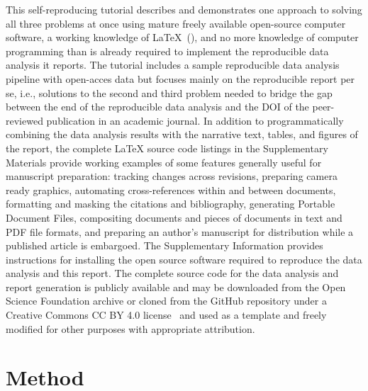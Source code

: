 \documentclass[helv,10pt,man,floatsintext]{apa6}  %
\begin{document}
This self-reproducing tutorial describes and demonstrates one approach
to solving all three problems at once using mature freely available
open-source computer software, a working knowledge of
\LaTeX{}~(\cite{latexproject}), and no more knowledge of computer
programming than is already required to implement the reproducible
data analysis it reports. The tutorial includes a sample reproducible
data analysis pipeline with open-acces data but focuses mainly on the
reproducible report per se, i.e., solutions to the second and third
problem needed to bridge the gap between the end of the reproducible
data analysis and the DOI of the peer-reviewed publication in an
academic journal. In addition to programmatically combining the data
analysis results with the narrative text, tables, and figures of the
report, the complete \LaTeX{} source code listings in the
Supplementary Materials provide working examples of some features
generally useful for manuscript preparation: tracking changes across
revisions, preparing camera ready graphics, automating
cross-references within and between documents, formatting and masking
the citations and bibliography, generating Portable Document Files,
compositing documents and pieces of documents in text and PDF file
formats, and preparing an author's manuscript for distribution while a
published article is embargoed.  The Supplementary Information
provides instructions for installing the open source software required
to reproduce the data analysis and this report. The complete source
code for the data analysis and report generation is publicly available
and may be downloaded from the Open Science Foundation archive or
cloned from the GitHub repository under a Creative Commons CC BY 4.0
license~\cite{ccby4.0} and used as a template and freely modified for
other purposes with appropriate attribution.

\section{Method}
\end{document}
